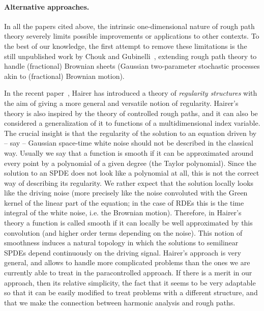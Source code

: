 \documentclass[11pt,a4paper]{article}
\theoremstyle{remark}
\begin{document}
\paragraph{Alternative approaches.}

In all the papers cited above, the intrinsic one-dimensional nature of rough path theory severely limits possible improvements or applications to other contexts. To the best of our knowledge, the first attempt to remove these limitations is the still unpublished work by Chouk and Gubinelli~\cite{Chouk2013}, extending rough path theory to handle (fractional) Brownian sheets (Gaussian two-parameter stochastic processes akin to (fractional) Brownian motion).

In the recent paper~\cite{Hairer2013a}, Hairer has introduced a theory of \emph{regularity structures} with the aim of giving a more general and versatile notion of regularity. Hairer's theory is also inspired by the theory of controlled rough paths, and it can also be considered a generalization of it to functions of a multidimensional index variable. The crucial insight is that the regularity of the solution to an equation driven by -- say -- Gaussian space-time white noise should not be described in the classical way. Usually we say that a function is smooth if it can be approximated around every point by a polynomial of a given degree (the Taylor polynomial). Since the solution to an SPDE does not look like a polynomial at all, this is not the correct way of describing its regularity. We rather expect that the solution locally looks like the driving noise (more precisely like the noise convoluted with the Green kernel of the linear part of the equation; in the case of RDEs this is the time integral of the white noise, i.e. the Brownian motion). Therefore, in Hairer's theory a function is called smooth if it can locally be well approximated by this convolution (and higher order terms depending on the noise). This notion of smoothness induces a natural topology in which the solutions to semilinear SPDEs depend continuously on the driving signal. Hairer's approach is very general, and allows to handle more complicated problems than the ones we are currently able to treat in the paracontrolled approach. If there is a merit in our approach, then its relative simplicity, the fact that it seems to be very adaptable so that it can be easily modified to treat problems with a different structure, and that we make the connection between harmonic analysis and rough paths.
\end{document}

